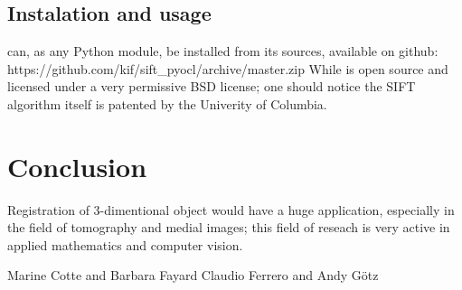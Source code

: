 \documentclass[preprint]{iucr}
\begin{document}
\subsection{Instalation and usage}
 can, as any Python module, be installed from its sources,
available on github:
https://github.com/kif/sift_pyocl/archive/master.zip 
While  is open source and licensed under a very
permissive BSD license; one should notice the SIFT algorithm itself is
patented by the Univerity of Columbia\cite{SIFT}.


\section{Conclusion}
Registration of 3-dimentional object would have a huge application, especially
in the field of tomography and medial images; this field of reseach is very
active in applied mathematics and computer vision.





Marine Cotte and Barbara Fayard
Claudio Ferrero and Andy G\"otz



\end{document}
